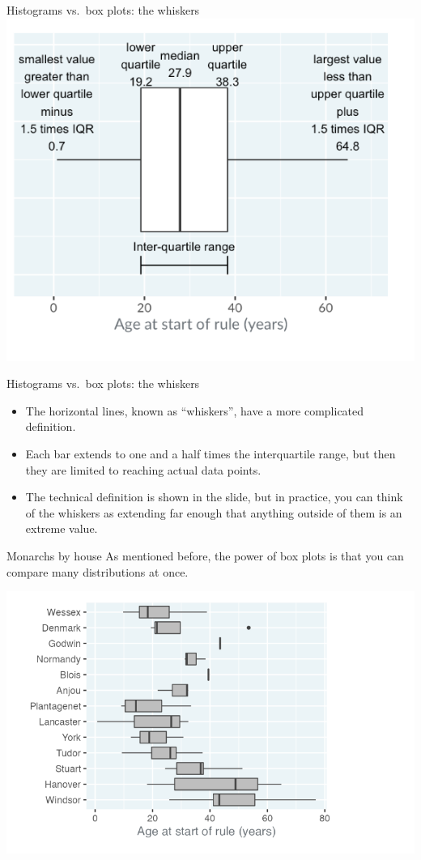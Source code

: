 \documentclass[
  ignorenonframetext,
]{beamer}
\begin{document}
\begin{frame}{Histograms vs.~box plots: the whiskers}
\label{histograms-vs.-box-plots-the-whiskers}
\includegraphics{../images/im27.png}
\end{frame}

\begin{frame}{Histograms vs.~box plots: the whiskers}
\label{histograms-vs.-box-plots-the-whiskers-1}
\begin{itemize}
\item
  The horizontal lines, known as ``whiskers'', have a more complicated
  definition.
\item
  Each bar extends to one and a half times the interquartile range, but
  then they are limited to reaching actual data points.
\item
  The technical definition is shown in the slide, but in practice, you
  can think of the whiskers as extending far enough that anything
  outside of them is an extreme value.
\end{itemize}
\end{frame}

\begin{frame}{Monarchs by house}
\label{monarchs-by-house}
As mentioned before, the power of box plots is that you can compare many
distributions at once.

\includegraphics{../images/im28.png}
\end{frame}
\end{document}
